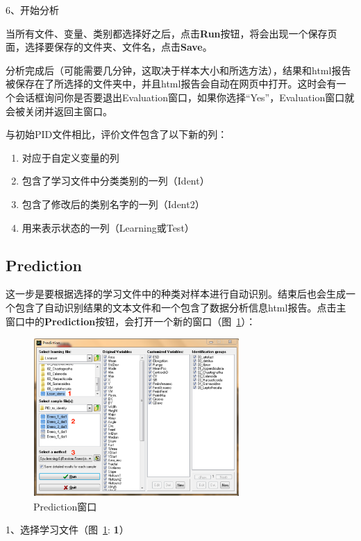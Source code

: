 \documentclass[12pt]{article}
\begin{document}
6、开始分析

当所有文件、变量、类别都选择好之后，点击\textbf{Run}按钮，将会出现一个保存页面，选择要保存的文件夹、文件名，点击\textbf{Save}。

分析完成后（可能需要几分钟，这取决于样本大小和所选方法），结果和html报告被保存在了所选择的文件夹中，并且html报告会自动在网页中打开。这时会有一个会话框询问你是否要退出Evaluation窗口，如果你选择“Yes”，Evaluation窗口就会被关闭并返回主窗口。

与初始PID文件相比，评价文件包含了以下新的列：
\begin{enumerate}
\item 对应于自定义变量的列
\item 包含了学习文件中分类类别的一列（Ident）
\item 包含了修改后的类别名字的一列（Ident2）
\item 用来表示状态的一列（Learning或Test）
\end{enumerate}

\subsection{Prediction}

这一步是要根据选择的学习文件中的种类对样本进行自动识别。结束后也会生成一个包含了自动识别结果的文本文件和一个包含了数据分析信息html报告。点击主窗口中的\textbf{Prediction}按钮，会打开一个新的窗口（图~\ref{fig: PredictionWindow}）：

\begin{figure}[!ht]
\centering
\includegraphics[width=0.7\textwidth]{PredictionWindow.eps}
\caption{Prediction窗口}
\label{fig: PredictionWindow}
\end{figure}

1、选择学习文件（图~\ref{fig: PredictionWindow}: {\color{red}\textbf{1}}）
\end{document}

